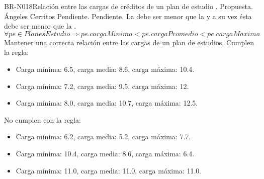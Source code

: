 \begin{BusinessRule}{BR-N018}{Relación entre las cargas de créditos de un plan de estudio}
	{\bcIntegridad}    %
	{\btEnabler}     %
	{\blControlling}    %
	.
	\BRItem[Estado] Propuesta.
	 Ángeles Cerritos
	 Pendiente.
	 Pendiente.
	\BRItem[Descripción] La  debe ser menor que la  y a su vez ésta debe ser menor que la .
	\BRItem[Sentencia]
	\[ \forall pe \in PlanesEstudio \Rightarrow pe.cargaMinima < pe.cargaPromedio < pe.cargaMaxima \]
	\BRItem[Motivación] Mantener una correcta relación entre las cargas de un plan de estudios.
	 Cumplen la regla:
		\begin{itemize}
			\item Carga mínima: 6.5, carga media: 8.6, carga máxima: 10.4.
			\item Carga mínima: 7.2, carga media: 9.5, carga máxima: 12.
			\item Carga mínima: 8.0, carga media: 10.7, carga máxima: 12.5.
		\end{itemize}
	 No cumplen con la regla:
		\begin{itemize}
			\item Carga mínima: 6.2, carga media: 5.2, carga máxima: 7.7.
			\item Carga mínima: 10.4, carga media: 8.6, carga máxima: 6.4.
			\item Carga mínima: 11.0, carga media: 11.0, carga máxima: 11.0.
		\end{itemize}
	
\end{BusinessRule}

